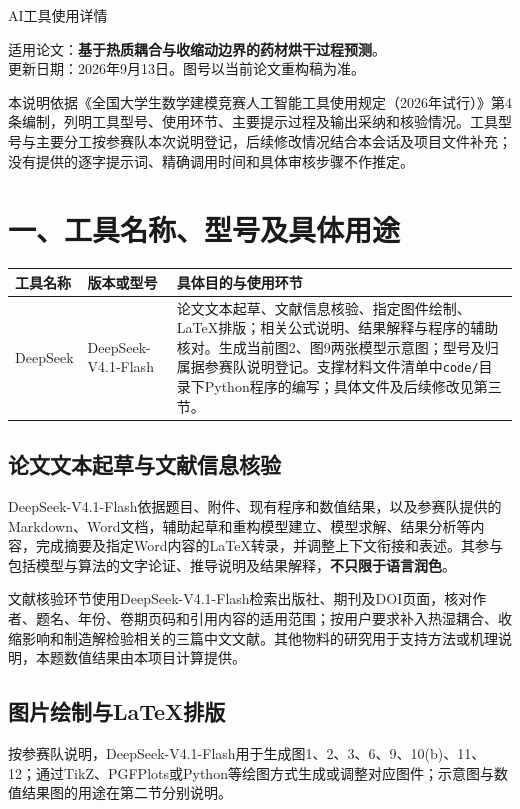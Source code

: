 \documentclass[UTF8,a4paper,zihao=-4]{ctexart}
\begin{document}
\pagestyle{plain}
\begin{center}{\heiti AI工具使用详情}\end{center}
\noindent 适用论文：\textbf{基于热质耦合与收缩动边界的药材烘干过程预测}。\\
更新日期：2026年9月13日。图号以当前论文重构稿为准。

本说明依据《全国大学生数学建模竞赛人工智能工具使用规定（2026年试行）》第4条编制，列明工具型号、使用环节、主要提示过程及输出采纳和核验情况。工具型号与主要分工按参赛队本次说明登记，后续修改情况结合本会话及项目文件补充；没有提供的逐字提示词、精确调用时间和具体审核步骤不作推定。

\section*{一、工具名称、型号及具体用途}
\par\noindent\begin{tabularx}{\textwidth}{@{}>{\raggedright\arraybackslash}p{}p{}L@{}}
\toprule 工具名称&版本或型号&具体目的与使用环节\\\midrule
DeepSeek&DeepSeek-V4.1-Flash&论文文本起草、文献信息核验、指定图件绘制、LaTeX排版；相关公式说明、结果解释与程序的辅助核对。生成当前图2、图9两张模型示意图；型号及归属据参赛队说明登记。支撑材料文件清单中\texttt{code/}目录下Python程序的编写；具体文件及后续修改见第三节。\\
\bottomrule
\end{tabularx}

\subsection*{论文文本起草与文献信息核验}
DeepSeek-V4.1-Flash依据题目、附件、现有程序和数值结果，以及参赛队提供的Markdown、Word文档，辅助起草和重构模型建立、模型求解、结果分析等内容，完成摘要及指定Word内容的LaTeX转录，并调整上下文衔接和表述。其参与包括模型与算法的文字论证、推导说明及结果解释，\textbf{不只限于语言润色}。

文献核验环节使用DeepSeek-V4.1-Flash检索出版社、期刊及DOI页面，核对作者、题名、年份、卷期页码和引用内容的适用范围；按用户要求补入热湿耦合、收缩影响和制造解检验相关的三篇中文文献。其他物料的研究用于支持方法或机理说明，本题数值结果由本项目计算提供。

\subsection*{图片绘制与LaTeX排版}
按参赛队说明，DeepSeek-V4.1-Flash用于生成图1、2、3、6、9、10(b)、11、12；通过TikZ、PGFPlots或Python等绘图方式生成或调整对应图件；示意图与数值结果图的用途在第二节分别说明。
\end{document}
